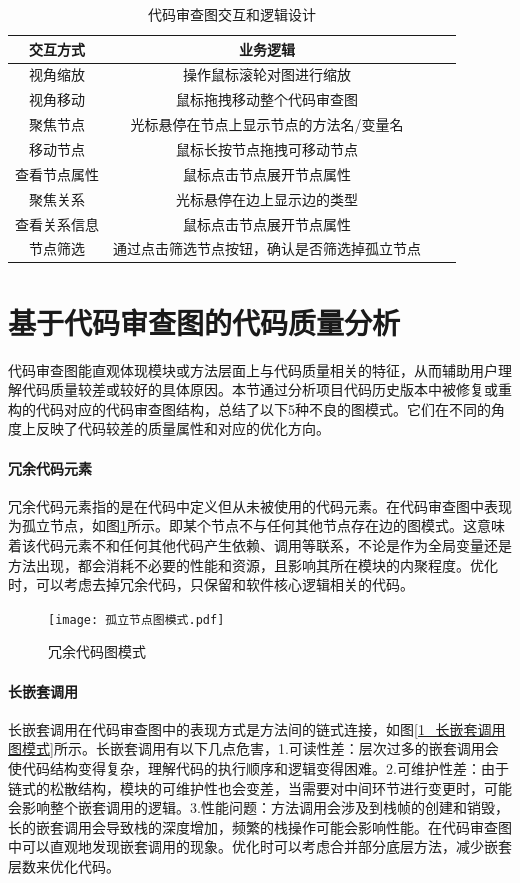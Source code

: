 \begin{table}[htbp]
\caption{代码审查图交互和逻辑设计}
\vspace{0.5em}\centering\wuhao
\begin{tabular}{cccc}
\toprule
交互方式 & 业务逻辑 \\
\midrule
视角缩放 & 操作鼠标滚轮对图进行缩放  \\
视角移动 & 鼠标拖拽移动整个代码审查图   \\
聚焦节点 & 光标悬停在节点上显示节点的方法名/变量名  \\
移动节点 & 鼠标长按节点拖拽可移动节点 \\
查看节点属性 & 鼠标点击节点展开节点属性  \\
聚焦关系 & 光标悬停在边上显示边的类型  \\
查看关系信息 & 鼠标点击节点展开节点属性  \\
节点筛选 & 通过点击筛选节点按钮，确认是否筛选掉孤立节点 \\
\bottomrule
\end{tabular}
\end{table}


\section{基于代码审查图的代码质量分析}


代码审查图能直观体现模块或方法层面上与代码质量相关的特征，从而辅助用户理解代码质量较差或较好的具体原因。本节通过分析项目代码历史版本中被修复或重构的代码对应的代码审查图结构，总结了以下5种不良的图模式。它们在不同的角度上反映了代码较差的质量属性和对应的优化方向。

\paragraph{冗余代码元素} 冗余代码元素指的是在代码中定义但从未被使用的代码元素。在代码审查图中表现为孤立节点，如图\ref{1_冗余代码图模式}所示。即某个节点不与任何其他节点存在边的图模式。这意味着该代码元素不和任何其他代码产生依赖、调用等联系，不论是作为全局变量还是方法出现，都会消耗不必要的性能和资源，且影响其所在模块的内聚程度。优化时，可以考虑去掉冗余代码，只保留和软件核心逻辑相关的代码。

\begin{figure}[h]
\centering
\texttt{[image: 孤立节点图模式.pdf]}
\caption{冗余代码图模式}
\label{1_冗余代码图模式}
\end{figure}



\paragraph{长嵌套调用} 长嵌套调用在代码审查图中的表现方式是方法间的链式连接，如图\ref{1_长嵌套调用图模式}所示。长嵌套调用有以下几点危害，1.可读性差：层次过多的嵌套调用会使代码结构变得复杂，理解代码的执行顺序和逻辑变得困难。2.可维护性差：由于链式的松散结构，模块的可维护性也会变差，当需要对中间环节进行变更时，可能会影响整个嵌套调用的逻辑。3.性能问题：方法调用会涉及到栈帧的创建和销毁，长的嵌套调用会导致栈的深度增加，频繁的栈操作可能会影响性能。在代码审查图中可以直观地发现嵌套调用的现象。优化时可以考虑合并部分底层方法，减少嵌套层数来优化代码。

